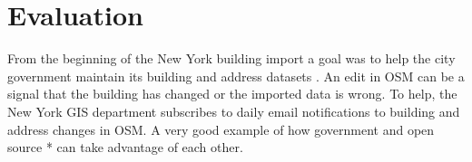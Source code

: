 \section{Evaluation}
From the beginning of the New York building import a goal was to help the city government maintain its building and address datasets \cite{Barth2014b}.  An edit in OSM can be a signal that the building has changed or the imported data is wrong. To help, the New York GIS department subscribes to daily email notifications to building and address changes in OSM. A very good example of how government and open source *%
  can take advantage of each other. 